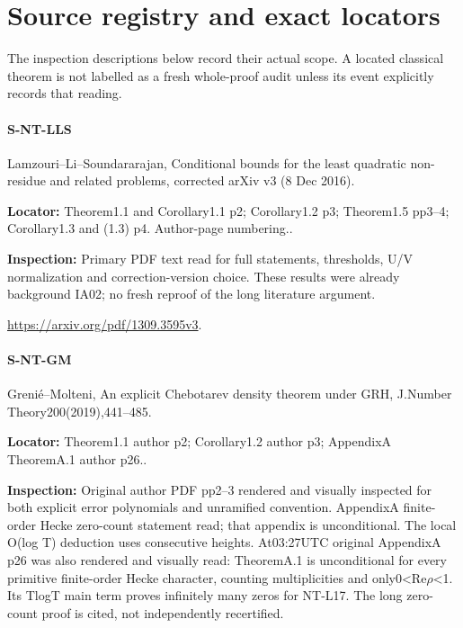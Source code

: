 \documentclass[11pt,a4paper]{article}
\begin{document}
\section*{Source registry and exact locators}
The inspection descriptions below record their actual scope. A located
classical theorem is not labelled as a fresh whole-proof audit unless
its event explicitly records that reading.

\paragraph{S-NT-LLS} Lamzouri–\allowbreak{}Li–\allowbreak{}Soundararajan, Conditional bounds for the least quadratic non-residue and related problems, corrected arXiv v3 (8 Dec 2016).

\textbf{Locator:} Theorem1.\allowbreak{}1 and Corollary1.\allowbreak{}1 p2; Corollary1.\allowbreak{}2 p3; Theorem1.\allowbreak{}5 pp3–\allowbreak{}4; Corollary1.\allowbreak{}3 and (1.\allowbreak{}3) p4.\allowbreak{} Author-page numbering.\allowbreak{}.

\textbf{Inspection:} Primary PDF text read for full statements, thresholds, U/\allowbreak{}V normalization and correction-version choice.\allowbreak{} These results were already background IA02; no fresh reproof of the long literature argument.\allowbreak{}

\url{https://arxiv.org/pdf/1309.3595v3}.

\paragraph{S-NT-GM} Grenié–\allowbreak{}Molteni, An explicit Chebotarev density theorem under GRH, J.\allowbreak{}Number Theory200(2019),441–\allowbreak{}485.

\textbf{Locator:} Theorem1.\allowbreak{}1 author p2; Corollary1.\allowbreak{}2 author p3; AppendixA TheoremA.\allowbreak{}1 author p26.\allowbreak{}.

\textbf{Inspection:} Original author PDF pp2–\allowbreak{}3 rendered and visually inspected for both explicit error polynomials and unramified convention.\allowbreak{} AppendixA finite-order Hecke zero-count statement read; that appendix is unconditional.\allowbreak{} The local O(log T) deduction uses consecutive heights.\allowbreak{} At03:\allowbreak{}27UTC original AppendixA p26 was also rendered and visually read:\allowbreak{} TheoremA.\allowbreak{}1 is unconditional for every primitive finite-order Hecke character, counting multiplicities and only0<Re\ensuremath{\rho}<1.\allowbreak{} Its TlogT main term proves infinitely many zeros for NT-L17.\allowbreak{} The long zero-count proof is cited, not independently recertified.\allowbreak{}
\end{document}
